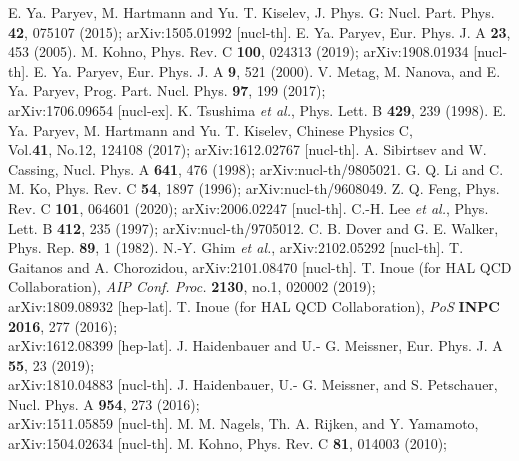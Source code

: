 \documentclass[12pt]{article}
\begin{document}
\begin{thebibliography}{99}
 E. Ya. Paryev, M. Hartmann and Yu. T. Kiselev, J. Phys. G:
                      Nucl. Part. Phys. {\bf 42}, 075107 (2015);
                      arXiv:1505.01992 [nucl-th].
 E. Ya. Paryev, Eur. Phys. J. A {\bf 23}, 453 (2005).
 M. Kohno, Phys. Rev. C {\bf 100}, 024313 (2019);
                        arXiv:1908.01934 [nucl-th].
 E. Ya. Paryev, Eur. Phys. J. A {\bf 9}, 521 (2000).
 V. Metag, M. Nanova, and E. Ya. Paryev, Prog. Part. Nucl. Phys. {\bf 97}, 199 (2017);\\
                            arXiv:1706.09654 [nucl-ex].
 K. Tsushima {\it et al.}, Phys. Lett. B {\bf 429}, 239 (1998).
 E. Ya. Paryev, M. Hartmann and Yu. T. Kiselev, Chinese Physics C, \\ Vol.{\bf 41}, No.12, 124108 (2017);
                             arXiv:1612.02767 [nucl-th].
 A. Sibirtsev and W. Cassing, Nucl. Phys. A {\bf 641}, 476 (1998);
                                        arXiv:nucl-th/9805021.
 G. Q. Li and C. M. Ko, Phys. Rev. C {\bf 54}, 1897 (1996);
                                        arXiv:nucl-th/9608049.
 Z. Q. Feng, Phys. Rev. C {\bf 101}, 064601 (2020);
                        arXiv:2006.02247 [nucl-th].
 C.-H. Lee {\it et al.}, Phys. Lett. B {\bf 412}, 235 (1997);
                                      arXiv:nucl-th/9705012.
 C. B. Dover and G. E. Walker, Phys. Rep. {\bf 89}, 1 (1982).
 N.-Y. Ghim {\it et al.}, arXiv:2102.05292 [nucl-th].
 T. Gaitanos and A. Chorozidou, arXiv:2101.08470 [nucl-th].
 T. Inoue (for HAL QCD Collaboration), {\it AIP Conf. Proc.} {\bf 2130}, no.1, 020002 (2019);\\
                                       arXiv:1809.08932 [hep-lat].
 T. Inoue (for HAL QCD Collaboration), {\it PoS} {\bf INPC 2016}, 277 (2016);\\
                                       arXiv:1612.08399 [hep-lat].
 J. Haidenbauer and  U.- G. Meissner, Eur. Phys. J. A {\bf 55}, 23 (2019);\\
                                       arXiv:1810.04883 [nucl-th].
 J. Haidenbauer, U.- G. Meissner, and S. Petschauer, Nucl. Phys. A {\bf 954}, 273 (2016);\\                                     arXiv:1511.05859 [nucl-th].
 M. M. Nagels, Th. A. Rijken, and Y. Yamamoto, arXiv:1504.02634 [nucl-th].
 M. Kohno, Phys. Rev. C {\bf 81}, 014003 (2010);\\

\end{thebibliography}
\end{document}
